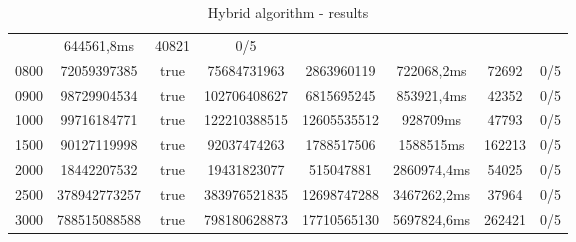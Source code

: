 \begin{table}[H]
{\begin{tabular}{|| c | c | c | c | c | c | c | c ||}
			 & 644561,8ms& 40821 & 0/5 \\
			0800 & 72059397385 & true & 75684731963 & 2863960119
			 & 722068,2ms& 72692 & 0/5 \\
			0900 & 98729904534 & true & 102706408627& 6815695245
			 & 853921,4ms& 42352 & 0/5 \\
			1000 & 99716184771 & true & 122210388515 & 12605535512
			 & 928709ms& 47793 & 0/5 \\
			1500 & 90127119998 & true & 92037474263 & 1788517506
			 & 1588515ms& 162213 & 0/5 \\
			2000 & 18442207532 & true & 19431823077 & 515047881
			 &2860974,4ms& 54025 & 0/5 \\
			2500 & 378942773257 & true & 383976521835 & 12698747288
			 & 3467262,2ms& 37964 & 0/5 \\
			3000 & 788515088588 & true & 798180628873 & 17710565130
			 & 5697824,6ms& 262421 & 0/5 \\
			\hline
		\end{tabular}
	}
	\caption{Hybrid algorithm - results}
	\label{tab:ha-results}
\end{table}
